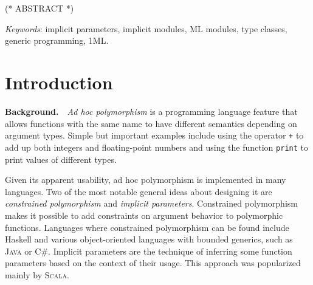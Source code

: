 \documentclass{spbau-diploma}
\begin{document}
\maketitle
\tableofcontents
\section*{}

(* ABSTRACT *)

\textit{Keywords}: implicit parameters, implicit modules, \textsc{ML} modules, type classes, generic programming, \textsc{1ML}.

\section{Introduction}

\textbf{Background.}~~\textit{Ad hoc polymorphism} is a programming language feature that allows functions with the same name to have different semantics depending on argument types. Simple but important examples include using the operator \texttt{+} to add up both integers and floating-point numbers and using the function \texttt{print} to print values of different types.

Given its apparent usability, ad hoc polymorphism is implemented in many languages. Two of the most notable general ideas about designing it are \textit{constrained polymorphism} and \textit{implicit parameters}. Constrained polymorphism makes it possible to add constraints on argument behavior to polymorphic functions. Languages where constrained polymorphism can be found include Haskell and various object-oriented languages with bounded generics, such as \textsc{Java} or \textsc{C\#}. Implicit parameters are the technique of inferring some function parameters based on the context of their usage. This approach was popularized mainly by \textsc{Scala}.
\end{document}
